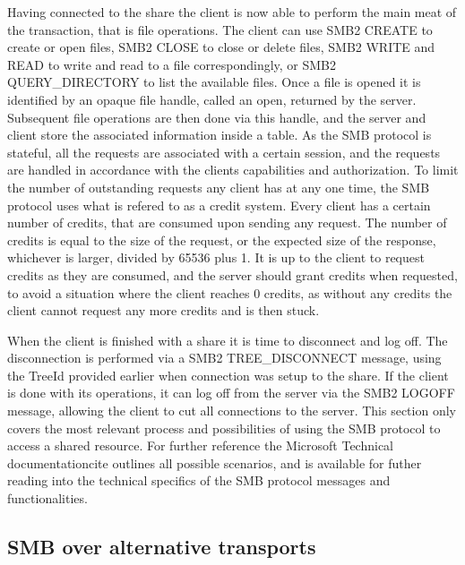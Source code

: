 \documentclass[english, 12pt, a4paper, elec, utf8, a-2b, online]{aaltothesis}
\begin{document}
Having connected to the share the client is now able to perform the main meat of the
transaction, that is file operations. The client can use SMB2 CREATE to create
or open files, SMB2 CLOSE to close or delete files, SMB2 WRITE and READ to write and
read to a file correspondingly, or SMB2 QUERY\_DIRECTORY to list the available files.
Once a file is opened it is identified by an opaque file handle, called an open, returned by the server.
Subsequent file operations are then done via this handle, and the server and client
store the associated information inside a table.
As the SMB protocol is stateful, all the requests are associated with a certain
session, and the requests are handled in accordance with the clients capabilities
and authorization. To limit the number of outstanding requests any client has at
any one time, the SMB protocol uses what is refered to as a credit system. Every
client has a certain number of credits, that are consumed upon sending any request.
The number of credits is equal to the size of the request, or the expected size of
the response, whichever is larger, divided by 65536 plus 1. It is up to the client
to request credits as they are consumed, and the server should grant credits when
requested, to avoid a situation where the client reaches 0 credits, as without
any credits the client cannot request any more credits and is then stuck\cite{smb2_tech}.

When the client is finished with a share it is time to disconnect and log off. The
disconnection is performed via a SMB2 TREE\_DISCONNECT message, using the TreeId
provided earlier when connection was setup to the share. If the client is done with its
operations, it can log off from the server via the SMB2 LOGOFF message, allowing
the client to cut all connections to the server. This section only covers the most
relevant process and possibilities of using the SMB protocol to access a shared resource.
For further reference the Microsoft Technical documentationcite\cite{smb2_tech} outlines all possible
scenarios, and is available for futher reading into the technical specifics of the
SMB protocol messages and functionalities.

\subsection{SMB over alternative transports}
\end{document}
